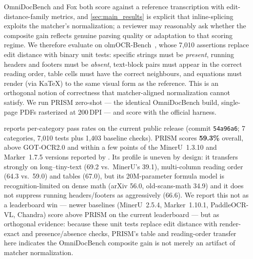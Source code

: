 OmniDocBench and Fox both score against a reference transcription with edit-distance-family metrics, and \cref{sec:main_results} is explicit that inline-splicing exploits the matcher's normalization; a reviewer may reasonably ask whether the composite gain reflects genuine parsing quality or adaptation to that scoring regime. We therefore evaluate on olmOCR-Bench~\cite{olmocr}, whose 7{,}010 assertions replace edit distance with binary unit tests: specific strings must be \emph{present}, running headers and footers must be \emph{absent}, text-block pairs must appear in the correct reading order, table cells must have the correct neighbours, and equations must render (via KaTeX) to the same visual form as the reference. This is an orthogonal notion of correctness that matcher-aligned normalization cannot satisfy. We run PRISM zero-shot --- the identical OmniDocBench build, single-page PDFs rasterized at 200\,DPI --- and score with the official harness.

 reports per-category pass rates on the current public release (commit \texttt{54a96a6}; 7 categories, 7{,}010 tests plus 1{,}403 baseline checks). PRISM scores \textbf{59.3\%} overall, above GOT-OCR2.0 and within a few points of the MinerU~1.3.10 and Marker~1.7.5 versions reported by \citet{olmocr}. Its profile is uneven by design: it transfers strongly on long--tiny-text (69.2 vs.\ MinerU's 39.1), multi-column reading order (64.3 vs.\ 59.0) and tables (67.0), but its 20M-parameter formula model is recognition-limited on dense math (arXiv 56.0, old-scans-math 34.9) and it does not suppress running headers/footers as aggressively (66.6). We report this not as a leaderboard win --- newer baselines (MinerU~2.5.4, Marker~1.10.1, PaddleOCR-VL, Chandra) score above PRISM on the current leaderboard --- but as orthogonal evidence: because these unit tests replace edit distance with render-exact and presence/absence checks, PRISM's table and reading-order transfer here indicates the OmniDocBench composite gain is not merely an artifact of matcher normalization.

